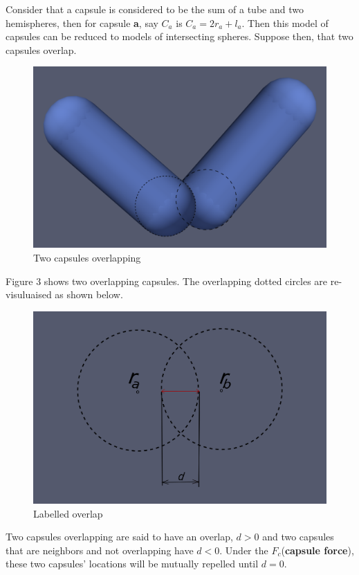 \documentclass[journal, a4paper]{IEEEtran}
\begin{document}
	Consider that a capsule is considered to be the sum of a tube and two hemispheres, then for capsule \textbf{a}, say $C_a$ is $C_a=2r_a+l_a$. Then this model of capsules can be reduced to models of intersecting spheres. Suppose then, that two capsules overlap.
	\begin{figure}[H]
	    \centering
	    \includegraphics[scale = 0.22]{OverlappingCapsules.png}
	    \caption{Two capsules overlapping}
	    \label{fig:overlapping_capsules}
	\end{figure}
	Figure 3 shows two overlapping capsules. The overlapping dotted circles are re-visuluaised as shown below.
	\begin{figure}[H]
	    \centering
	    \includegraphics[scale = 0.42]{SkeletonOverlap.png}
	    \caption{Labelled overlap}
	    \label{fig:skeleton_overlap}
	\end{figure}	
    Two capsules overlapping are said to have an overlap, $d>0$ and two capsules that are neighbors and not overlapping have $d<0$. Under the $F_c$(\textbf{capsule force}), these two capsules' locations will be mutually repelled until $d=0$. 
\end{document}
